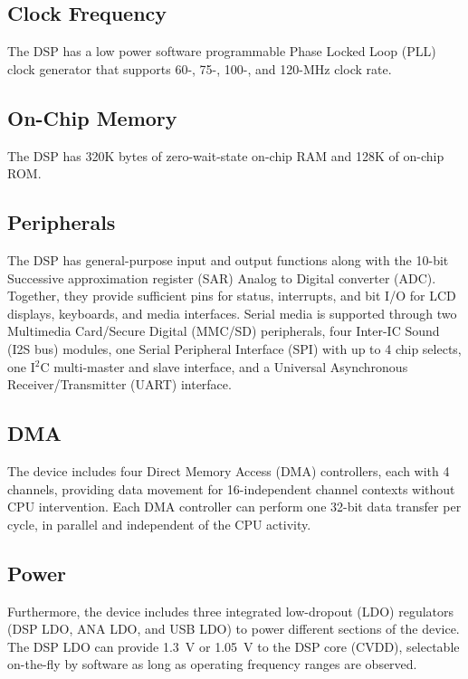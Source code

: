 \subsection{Clock Frequency}

The DSP has a low power software programmable Phase Locked Loop (PLL)
clock generator that supports 60-, 75-, 100-, and 120-MHz clock rate.

\subsection{On-Chip Memory}

The DSP has 320K bytes of zero-wait-state on-chip RAM and 128K of
on-chip ROM. 

\subsection{Peripherals}

The DSP has general-purpose input and output functions along with the
10-bit Successive approximation register (SAR) Analog to Digital
converter (ADC).  Together, they provide sufficient pins for status,
interrupts, and bit I/O for LCD displays, keyboards, and media
interfaces. Serial media is supported through two Multimedia
Card/Secure Digital (MMC/SD) peripherals, four Inter-IC Sound (I2S
bus) modules, one Serial Peripheral Interface (SPI) with up to 4 chip
selects, one I$^2$C multi-master and slave interface, and a Universal
Asynchronous Receiver/Transmitter (UART) interface. 

\subsection{DMA}

The device includes four Direct Memory Access (DMA) controllers, each
with 4 channels, providing data movement for 16-independent channel
contexts without CPU intervention. Each DMA controller can perform
one 32-bit data transfer per cycle, in parallel and independent of
the CPU activity.


\subsection{Power}

Furthermore, the device includes three integrated low-dropout (LDO)
regulators (DSP LDO, ANA LDO, and USB LDO) to power different
sections of the device. The DSP LDO can provide 1.3~V or 1.05~V to
the DSP core (CVDD), selectable on-the-fly by software as long as
operating frequency ranges are observed.


